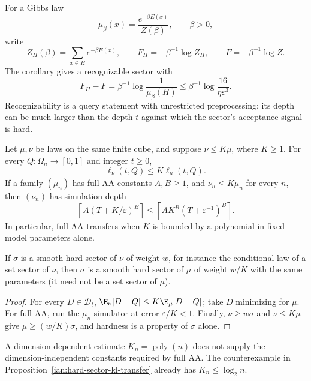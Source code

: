 For a Gibbs law
\[
 \mu_\beta(x)=\frac{e^{-\beta E(x)}}{Z(\beta)},\qquad \beta>0,
\]
write
\[
 Z_H(\beta)=\sum_{x\in H}e^{-\beta E(x)},\qquad
 F_H=-\beta^{-1}\log Z_H,\qquad F=-\beta^{-1}\log Z.
\]
The corollary gives a recognizable sector with
\[
 F_H-F
 =\beta^{-1}\log\frac1{\mu_\beta(H)}
 \le\beta^{-1}\log\frac{16}{\eta\varepsilon^3}.
\]
Recognizability is a query statement with unrestricted preprocessing;
its depth can be much larger than the depth \(t\) against which the
sector's acceptance signal is hard.

\begin{proposition}
\label{ian:hard-sector-density-transfer}
Let \(\mu,\nu\) be laws on the same finite cube, and suppose
\(\nu\le K\mu\), where \(K\ge1\). For every \(Q:\Omega_n\to[0,1]\)
and integer \(t\ge0\),
\[
 \ell_\nu(t,Q)\le K\ell_\mu(t,Q).
\]
If a family \((\mu_n)\) has full-AA constants \(A,B\ge1\), and
\(\nu_n\le K\mu_n\) for every \(n\), then \((\nu_n)\) has simulation
depth
\[
 \left\lceil A(T+K/\varepsilon)^B\right\rceil
 \le
 \left\lceil AK^B(T+\varepsilon^{-1})^B\right\rceil.
\]
In particular, full AA transfers when \(K\) is bounded by a polynomial
in fixed model parameters alone.

If \(\sigma\) is a smooth hard sector of \(\nu\) of weight \(w\), for
instance the conditional law of a set sector of \(\nu\), then
\(\sigma\) is a smooth hard sector of \(\mu\) of weight \(w/K\) with the
same parameters (it need not be a set sector of \(\mu\)).
\end{proposition}

\begin{proof}
For every \(D\in\mathcal D_t\),
\(\E_\nu|D-Q|\le K\E_\mu|D-Q|\); take \(D\) minimizing for \(\mu\).
For full AA, run the \(\mu_n\)-simulator at error \(\varepsilon/K<1\).
Finally, \(\nu\ge w\sigma\) and \(\nu\le K\mu\) give
\(\mu\ge(w/K)\sigma\), and hardness is a property of \(\sigma\) alone.
\end{proof}

A dimension-dependent estimate \(K_n=\operatorname{poly}(n)\) does
not supply the dimension-independent constants required by full AA.
The counterexample in Proposition~\ref{ian:hard-sector-kl-transfer}
already has \(K_n\le\log_2 n\).

